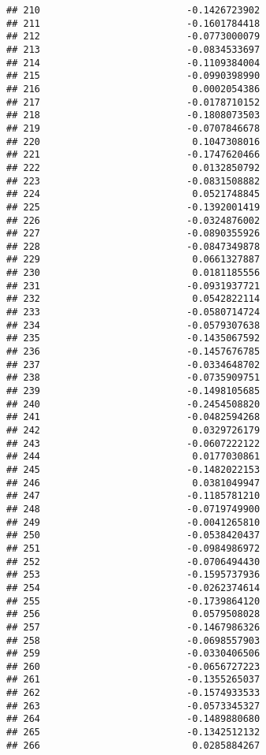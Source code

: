 \documentclass[
]{article}
\begin{document}
\begin{verbatim}
## 210                          -0.1426723902
## 211                          -0.1601784418
## 212                          -0.0773000079
## 213                          -0.0834533697
## 214                          -0.1109384004
## 215                          -0.0990398990
## 216                           0.0002054386
## 217                          -0.0178710152
## 218                          -0.1808073503
## 219                          -0.0707846678
## 220                           0.1047308016
## 221                          -0.1747620466
## 222                           0.0132850792
## 223                          -0.0831508882
## 224                           0.0521748845
## 225                          -0.1392001419
## 226                          -0.0324876002
## 227                          -0.0890355926
## 228                          -0.0847349878
## 229                           0.0661327887
## 230                           0.0181185556
## 231                          -0.0931937721
## 232                           0.0542822114
## 233                          -0.0580714724
## 234                          -0.0579307638
## 235                          -0.1435067592
## 236                          -0.1457676785
## 237                          -0.0334648702
## 238                          -0.0735909751
## 239                          -0.1498105685
## 240                          -0.2454508820
## 241                          -0.0482594268
## 242                           0.0329726179
## 243                          -0.0607222122
## 244                           0.0177030861
## 245                          -0.1482022153
## 246                           0.0381049947
## 247                          -0.1185781210
## 248                          -0.0719749900
## 249                          -0.0041265810
## 250                          -0.0538420437
## 251                          -0.0984986972
## 252                          -0.0706494430
## 253                          -0.1595737936
## 254                          -0.0262374614
## 255                          -0.1739864120
## 256                           0.0579508028
## 257                          -0.1467986326
## 258                          -0.0698557903
## 259                          -0.0330406506
## 260                          -0.0656727223
## 261                          -0.1355265037
## 262                          -0.1574933533
## 263                          -0.0573345327
## 264                          -0.1489880680
## 265                          -0.1342512132
## 266                           0.0285884267

\end{verbatim}
\end{document}
